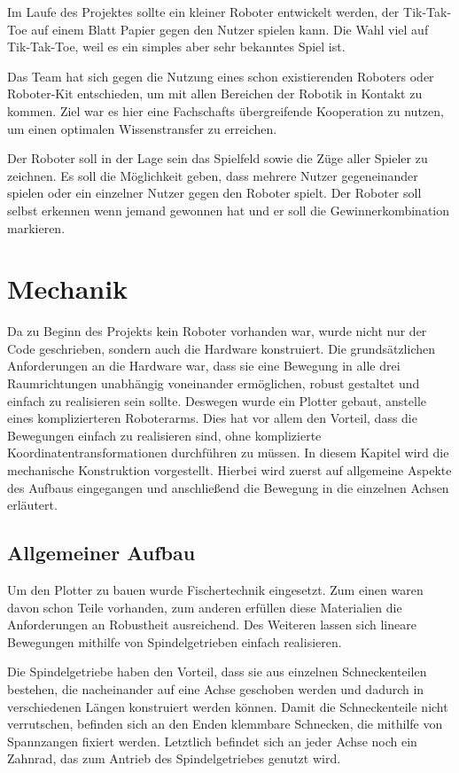 \documentclass[conference,compsoc,final,a4paper]{IEEEtran}
\begin{document}
Im Laufe des Projektes sollte ein kleiner Roboter entwickelt werden, der Tik-Tak-Toe auf einem Blatt Papier gegen den Nutzer spielen kann. Die Wahl viel auf Tik-Tak-Toe, weil es ein simples aber sehr bekanntes Spiel ist.

Das Team hat sich gegen die Nutzung eines schon existierenden Roboters oder Roboter-Kit
entschieden, um mit allen Bereichen der Robotik in Kontakt zu kommen. Ziel war es hier
eine Fachschafts übergreifende Kooperation zu nutzen, um einen optimalen Wissenstransfer
zu erreichen.

Der Roboter  soll in der Lage sein das Spielfeld sowie die Züge aller Spieler zu zeichnen. Es soll die Möglichkeit geben, dass mehrere Nutzer gegeneinander spielen oder ein einzelner Nutzer gegen den Roboter spielt. Der Roboter soll selbst erkennen wenn jemand gewonnen hat und er soll die Gewinnerkombination markieren. 


\section{Mechanik}

Da zu Beginn des Projekts kein Roboter vorhanden war, wurde nicht nur der Code geschrieben, sondern auch die Hardware
konstruiert. Die grundsätzlichen Anforderungen an die Hardware war, dass sie eine Bewegung in alle drei Raumrichtungen
unabhängig voneinander ermöglichen, robust gestaltet und einfach zu realisieren sein sollte. Deswegen wurde ein
Plotter gebaut, anstelle eines komplizierteren Roboterarms. Dies hat vor allem den Vorteil, dass die Bewegungen einfach zu
realisieren sind, ohne komplizierte Koordinatentransformationen durchführen zu müssen. In diesem Kapitel wird die mechanische Konstruktion
vorgestellt. Hierbei wird zuerst auf allgemeine Aspekte des Aufbaus eingegangen und anschließend die Bewegung in die einzelnen Achsen erläutert.

\subsection{Allgemeiner Aufbau}

Um den Plotter zu bauen wurde Fischertechnik eingesetzt. Zum einen waren davon schon Teile vorhanden, zum anderen erfüllen diese
Materialien die Anforderungen an Robustheit ausreichend. Des Weiteren lassen sich lineare Bewegungen mithilfe von Spindelgetrieben
 einfach realisieren.

Die Spindelgetriebe haben den Vorteil, dass sie aus einzelnen Schneckenteilen bestehen, die nacheinander auf eine Achse geschoben
werden und dadurch in verschiedenen Längen konstruiert werden können. Damit die Schneckenteile nicht verrutschen, befinden sich an
den Enden klemmbare Schnecken, die mithilfe von Spannzangen fixiert werden. Letztlich befindet sich an jeder Achse noch ein Zahnrad,
das zum Antrieb des Spindelgetriebes genutzt wird.
\end{document}
